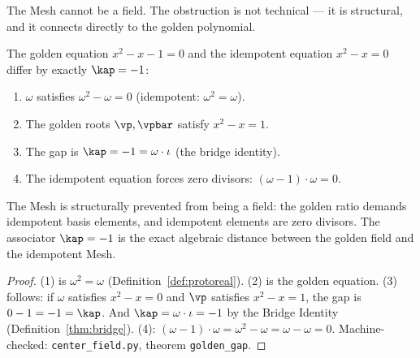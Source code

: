 The Mesh cannot be a field. The obstruction is not technical --- it is structural, and it connects directly to the golden polynomial.

\begin{theorem}{\label{thm:golden-gap}}
The golden equation $x^2 - x - 1 = 0$ and the idempotent equation $x^2 - x = 0$ differ by exactly $\kap = -1$:
\begin{enumerate}
\item $\omega$ satisfies $\omega^2 - \omega = 0$ (idempotent: $\omega^2 = \omega$).
\item The golden roots $\vp, \vpbar$ satisfy $x^2 - x = 1$.
\item The gap is $\kap = -1 = \omega \cdot \iota$ (the bridge identity).
\item The idempotent equation forces zero divisors: $(\omega - 1) \cdot \omega = 0$.
\end{enumerate}
The Mesh is structurally prevented from being a field: the golden ratio demands idempotent basis elements, and idempotent elements are zero divisors. The associator $\kap = -1$ is the exact algebraic distance between the golden field and the idempotent Mesh.
\end{theorem}

\begin{proof}
(1) is $\omega^2 = \omega$ (Definition~\ref{def:protoreal}). (2) is the golden equation. (3) follows: if $\omega$ satisfies $x^2 - x = 0$ and $\vp$ satisfies $x^2 - x = 1$, the gap is $0 - 1 = -1 = \kap$. And $\kap = \omega \cdot \iota = -1$ by the Bridge Identity (Definition~\ref{thm:bridge}). (4): $(\omega - 1) \cdot \omega = \omega^2 - \omega = \omega - \omega = 0$. Machine-checked: \texttt{center\_field.py}, theorem \texttt{golden\_gap}. \qedhere
\end{proof}

